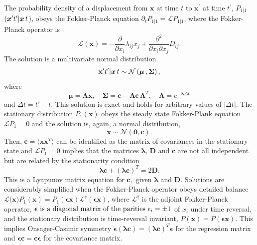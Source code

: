 \documentclass[english,aps, twocolumn, pre,superscriptaddress, notitlepage]{revtex4-1}
\begin{document}
The probability density of a displacement from $\boldsymbol{x}$ at
time $t$ to $\boldsymbol{x}^{\prime}$ at time $t^{\prime}$, $P_{1|1}$$(\boldsymbol{x}^{\prime}t^{\prime}|\boldsymbol{x}\thinspace t$),
obeys the Fokker-Planck equation $\partial_{t}P_{1|1}=\mathcal{L}P_{1|1}$,
where the Fokker-Planck operator is
\begin{equation}
\mathcal{L}(\boldsymbol{x})=-\frac{\partial}{\partial x_{i}}\lambda_{ij}x_{j}+\frac{\partial^{2}}{\partial x_{i}\partial x_{j}}D_{ij}.
\end{equation}
The solution is a multivariate normal distribution
\begin{equation}
\mathbf{\boldsymbol{x}}^{\prime}t^{\prime}|\boldsymbol{x}\thinspace t\sim\mathcal{N}\left(\boldsymbol{\mu}\,,\boldsymbol{\Sigma}\right),\label{eq:conditional-probability}
\end{equation}
where 
\begin{equation}
\boldsymbol{\mu}=\boldsymbol{\Lambda}\boldsymbol{x},\quad\boldsymbol{\Sigma}=\boldsymbol{c}-\boldsymbol{\Lambda}\boldsymbol{c}\,\boldsymbol{\Lambda}^{T},\quad\boldsymbol{\Lambda}=e^{-\boldsymbol{\lambda}\Delta t}
\end{equation}
and $\Delta t=t'-t$. This solution is exact and holds for arbitrary
values of $|\Delta t|$. The stationary distribution $P_{1}(\boldsymbol{x})$
obeys the steady state Fokker-Plank equation $\mathcal{L}P_{1}=0$
and the solution is, again, a normal distribution,
\begin{equation}
\boldsymbol{x}\sim\mathcal{N}\left(\boldsymbol{0},\boldsymbol{c}\right).
\end{equation}
Then, $\boldsymbol{c}=\langle\boldsymbol{x}\boldsymbol{x}^{T}\rangle$
can be identified as the matrix of covariances in the stationary state
and $\mathcal{L}P_{1}=0$ implies that the matrices $\boldsymbol{\lambda}$,
$\boldsymbol{D}$ and $\boldsymbol{c}$ are not all independent but
are related by the stationarity condition
\begin{equation}
\boldsymbol{\lambda c}+(\boldsymbol{\lambda c})^{T}=2\boldsymbol{D}.\label{eq:stationarity}
\end{equation}
This is a Lyapunov matrix equation for $\boldsymbol{c},$ given $\boldsymbol{\lambda}$
and $\boldsymbol{D}$. Solutions are considerably simplified when
the Fokker-Planck operator obeys detailed balance $\mathcal{L}(\boldsymbol{x)}P_{1}(\boldsymbol{x})=P_{1}(\boldsymbol{\epsilon x})\mathcal{L}^{\dagger}(\boldsymbol{\epsilon x})$,
where $\mathcal{L^{\dagger}}$ is the adjoint Fokker-Planck operator,
$\text{\ensuremath{\boldsymbol{\epsilon}} is a diagonal matrix of the parities }\epsilon_{i}=\pm1$
of $x_{i}$ under time reversal, and the stationary distribution is
time-reversal invariant, $P(\boldsymbol{x})=P(\boldsymbol{\epsilon x})$.
This implies Onsager-Casimir symmetry $\boldsymbol{\epsilon}(\boldsymbol{\lambda c})=(\boldsymbol{\lambda c})^{T}\boldsymbol{\epsilon}$
for the regression matrix and $\boldsymbol{\epsilon c}=\boldsymbol{c\epsilon}$
for the covariance matrix.
\end{document}
